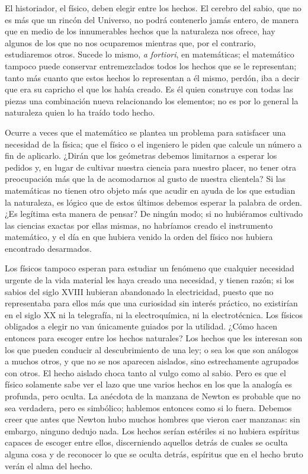\documentclass[a4paper, 12pt]{article}
\begin{document}
El historiador, el físico, deben elegir entre los hechos. El cerebro
del sabio, que no es más que un rincón del Universo, no podrá
contenerlo jamás entero, de manera que en medio de los innumerables
hechos que la naturaleza nos ofrece, hay algunos de los que no nos
ocuparemos mientras que, por el contrario, estudiaremos otros. Sucede lo
mismo, {\it a fortiori}, en matemáticas; el matemático tampoco puede
conservar entremezclados todos los hechos que se le representan; tanto más cuanto que estos hechos lo representan a él mismo, perdón,
iba a decir que era su capricho el que los había creado. Es él
quien construye con todas las piezas una combinación nueva relacionando
los elementos; no es por lo general la naturaleza quien lo ha traído
todo hecho.

Ocurre a veces que el matemático se plantea un problema para satisfacer
una necesidad de la física; que el físico o el ingeniero le piden
que calcule un número a fin de aplicarlo. ¿Dirán que los geómetras debemos limitarnos a esperar los pedidos y, en lugar de cultivar
nuestra ciencia para nuestro placer, no tener otra preocupación más
que la de acomodarnos al gusto de nuestra clientela? Si las matemáticas
no tienen otro objeto más que acudir en ayuda de los que estudian la
naturaleza, es lógico que de estos últimos debemos esperar la
palabra de orden. ¿Es legítima esta manera de pensar? De ningún
modo; si no hubiéramos cultivado las ciencias exactas por ellas mismas,
no habríamos creado el instrumento matemático, y el día en que
hubiera venido la orden del físico nos hubiera encontrado desarmados.

Los físicos tampoco esperan para estudiar un fenómeno que cualquier
necesidad urgente de la vida material les haya creado una necesidad, y
tienen razón; si los sabios del siglo XVIII hubieran abandonado la
electricidad, puesto que no representaba para ellos más que una
curiosidad sin interés
práctico, no existirían en el siglo XX ni la telegrafía, ni la
electroquímica, ni la electrotécnica. Los físicos obligados a
elegir no van únicamente guiados por la utilidad. ¿Cómo hacen
entonces para escoger entre los hechos naturales? Los hechos que les interesan son los que pueden
conducir al descubrimiento de una ley; o sea los que son análogos a
muchos otros, y que no se nos aparecen aislados, sino estrechamente
agrupados con otros. El hecho aislado choca tanto al vulgo como al sabio.
Pero es que el físico solamente sabe ver el lazo que une varios hechos
en los que la analogía es profunda, pero oculta. La anécdota de la
manzana de Newton es probable que no sea verdadera, pero es simbólico;
hablemos entonces como si lo fuera. Debemos creer que antes que Newton hubo
muchos hombres que vieron caer manzanas: sin embargo, ninguno dedujo nada.
Los hechos serían estériles si no hubiera espíritus capaces de
escoger entre ellos, discerniendo aquellos detrás de cuales se oculta
alguna cosa y de reconocer lo que se oculta detrás, espíritus que
en el hecho bruto verán el alma del hecho.
\end{document}
